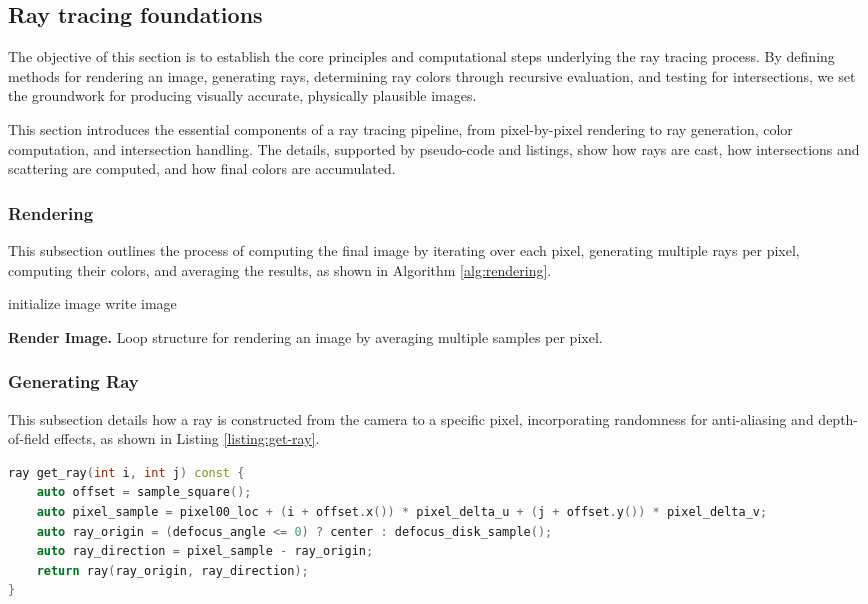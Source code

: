 \subsection{Ray tracing foundations}
\label{subsec:ray-tracing-foundations}
The objective of this section is to establish the core principles and computational steps underlying the ray tracing process. By defining methods for rendering an image, generating rays, determining ray colors through recursive evaluation, and testing for intersections, we set the groundwork for producing visually accurate, physically plausible images.

This section introduces the essential components of a ray tracing pipeline, from pixel-by-pixel rendering to ray generation, color computation, and intersection handling. The details, supported by pseudo-code and listings, show how rays are cast, how intersections and scattering are computed, and how final colors are accumulated.

\subsubsection{Rendering}
This subsection outlines the process of computing the final image by iterating over each pixel, generating multiple rays per pixel, computing their colors, and averaging the results, as shown in Algorithm \ref{alg:rendering}.

\begin{algorithm}[htbp]
initialize image\;
write image\;
\caption{\textbf{Render Image.} Loop structure for rendering an image by averaging multiple samples per pixel.}
\label{alg:rendering}
\end{algorithm}

\FloatBarrier
\subsubsection{Generating Ray}
This subsection details how a ray is constructed from the camera to a specific pixel, incorporating randomness for anti-aliasing and depth-of-field effects, as shown in Listing \ref{listing:get-ray}.

\begin{lstlisting}[caption={\textbf{Generating a ray from the camera to a screen pixel}},label={listing:get-ray}, name=get-ray, float=htbp, style=mystyle,language=C++]
ray get_ray(int i, int j) const {
    auto offset = sample_square();
    auto pixel_sample = pixel00_loc + (i + offset.x()) * pixel_delta_u + (j + offset.y()) * pixel_delta_v;
    auto ray_origin = (defocus_angle <= 0) ? center : defocus_disk_sample();
    auto ray_direction = pixel_sample - ray_origin;
    return ray(ray_origin, ray_direction);
}
\end{lstlisting}


